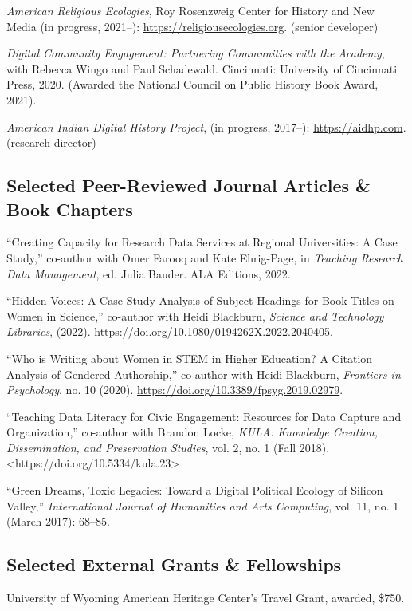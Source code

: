 \documentclass[10pt]{article}
\begin{document}
\emph{American Religious Ecologies}, Roy Rosenzweig Center for History and New Media (in progress, 2021--): \url{https://religiousecologies.org}. (senior developer)

\textit{Digital Community Engagement: Partnering Communities with the Academy}, with Rebecca Wingo and Paul Schadewald. Cincinnati: University of Cincinnati Press, 2020. (Awarded the National Council on Public History Book Award, 2021).

\emph{American Indian Digital History Project}, (in progress, 2017--): \url{https://aidhp.com}. (research director)

\subsection{Selected Peer-Reviewed Journal Articles \& Book Chapters}\label{peer-reviewed}

``Creating Capacity for Research Data Services at Regional Universities: A Case Study,'' co-author with Omer Farooq and Kate Ehrig-Page, in \emph{Teaching Research Data Management}, ed. Julia Bauder. ALA Editions, 2022.

``Hidden Voices: A Case Study Analysis of Subject Headings for Book Titles on Women in Science,'' co-author with Heidi Blackburn, \textit{Science and Technology Libraries}, (2022). \url{https://doi.org/10.1080/0194262X.2022.2040405}.

``Who is Writing about Women in STEM in Higher Education? A Citation Analysis of Gendered Authorship,'' co-author with Heidi Blackburn, \textit{Frontiers in Psychology}, no. 10 (2020). \url{https://doi.org/10.3389/fpsyg.2019.02979}.

``Teaching Data Literacy for Civic Engagement: Resources for Data Capture and Organization,'' co-author with Brandon Locke, \textit{KULA: Knowledge Creation, Dissemination, and Preservation Studies}, vol. 2, no. 1 (Fall 2018). <https://doi.org/10.5334/kula.23>

``Green Dreams, Toxic Legacies: Toward a Digital Political Ecology of Silicon Valley,'' \textit{International Journal of Humanities and Arts Computing}, vol. 11, no. 1 (March 2017): 68--85.

\subsection{Selected External Grants \& Fellowships}\label{grants-and-fellowships}

University of Wyoming American Heritage Center's Travel Grant, awarded, \$750.
\end{document}
